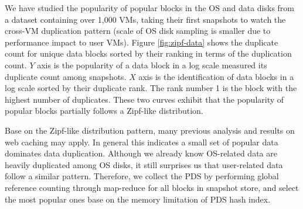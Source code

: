 We have studied the popularity of popular blocks in the OS and data disks from a dataset
containing over 1,000 VMs, taking their first snapshots to watch the cross-VM duplication pattern 
(scale of OS disk sampling is smaller due to performance impact to user VMs).
Figure \ref{fig:zipf-data} shows the duplicate count for unique data blocks sorted by their ranking in 
terms of the duplication count. $Y$ axis is the popularity of a data block in a log scale 
measured its duplicate count among snapshots. $X$ axis is the identification of data blocks in a log scale
sorted by their duplicate rank.  The rank number 1 is the block with the highest number of duplicates.
These two curves exhibit that the popularity of popular blocks partially follows a Zipf-like distribution.








Base on the Zipf-like distribution pattern, many previous analysis and results on web caching\cite{Adamic2002,Breslau1999b} may apply.
In general this indicates a small set of popular data dominates data duplication.
Although we already know OS-related data are heavily duplicated among OS disks, 
it still surprises us that user-related data follow a similar pattern.
Therefore, we collect the PDS by performing global reference counting through map-reduce for all
blocks in snapshot store, and select the most popular ones base on the memory limitation of
PDS hash index. 

